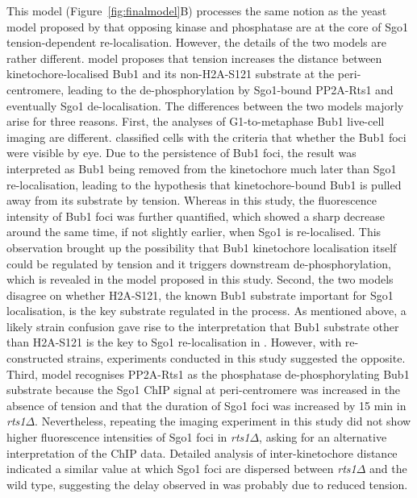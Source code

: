 This model (Figure~\ref{fig:finalmodel}B) processes the same notion as the yeast model proposed by \cite{Nerusheva2014} that opposing kinase and phosphatase are at the core of Sgo1 tension-dependent re-localisation. However, the details of the two models are rather different. \cite{Nerusheva2014} model proposes that tension increases the distance between kinetochore-localised Bub1 and its non-H2A-S121 substrate at the peri-centromere, leading to the de-phosphorylation by Sgo1-bound PP2A-Rts1 and eventually Sgo1 de-localisation. The differences between the two models majorly arise for three reasons. First, the analyses of G1-to-metaphase Bub1 live-cell imaging are different. \cite{Nerusheva2014} classified cells with the criteria that whether the Bub1 foci were visible by eye. Due to the persistence of Bub1 foci, the result was interpreted as Bub1 being removed from the kinetochore much later than Sgo1 re-localisation, leading to the hypothesis that kinetochore-bound Bub1 is pulled away from its substrate by tension. Whereas in this study, the fluorescence intensity of Bub1 foci was further quantified, which showed a sharp decrease around the same time, if not slightly earlier, when Sgo1 is re-localised. This observation brought up the possibility that Bub1 kinetochore localisation itself could be regulated by tension and it triggers downstream de-phosphorylation, which is revealed in the model proposed in this study. Second, the two models disagree on whether H2A-S121, the known Bub1 substrate important for Sgo1 localisation, is the key substrate regulated in the process. As mentioned above, a likely strain confusion gave rise to the interpretation that Bub1 substrate other than H2A-S121 is the key to Sgo1 re-localisation in \cite{Nerusheva2014}. However, with re-constructed strains, experiments conducted in this study suggested the opposite. Third, \cite{Nerusheva2014} model recognises PP2A-Rts1 as the phosphatase de-phosphorylating Bub1 substrate because the Sgo1 ChIP signal at peri-centromere was increased in the absence of tension and that the duration of Sgo1 foci was increased by 15 \si{\minute} in \textit{rts1$\Delta$}. Nevertheless, repeating the imaging experiment in this study did not show higher fluorescence intensities of Sgo1 foci in \textit{rts1$\Delta$}, asking for an alternative interpretation of the ChIP data. Detailed analysis of inter-kinetochore distance indicated a similar value at which Sgo1 foci are dispersed between \textit{rts1$\Delta$} and the wild type, suggesting the delay observed in \cite{Nerusheva2014} was probably due to reduced tension. 

